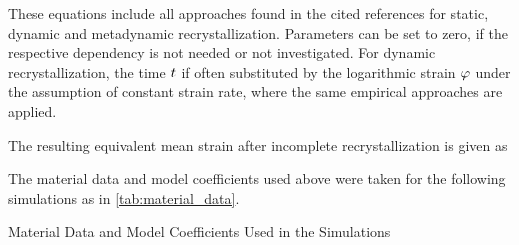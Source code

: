 These equations include all approaches found in the cited references for static, dynamic and metadynamic recrystallization.
Parameters can be set to zero, if the respective dependency is not needed or not investigated.
For dynamic recrystallization, the time ${t}$ if often substituted by the logarithmic strain ${\varphi}$ under the assumption of constant strain rate, where the same empirical approaches are applied.

The resulting equivalent mean strain after incomplete recrystallization is given as

The material data and model coefficients used above were taken for the following simulations as in \autoref{tab:material_data}.

\begin{table}
    \centering
    \caption{Material Data and Model Coefficients Used in the Simulations}
    \label{tab:material_data}
    
\end{table}

